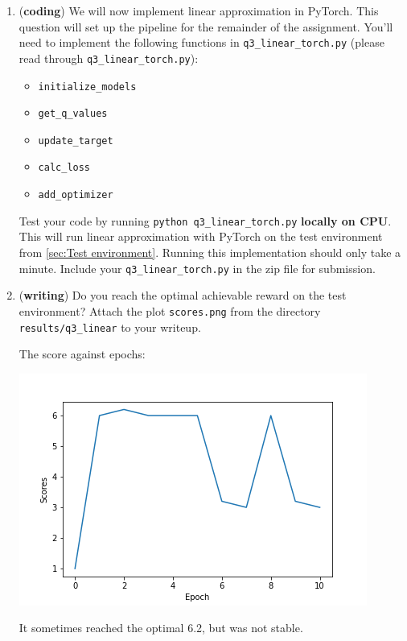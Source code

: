 \documentclass[11pt]{article}
\theoremstyle{case}
\begin{document}
\begin{enumerate}[label=(\alph*)]
    \item ({\bf coding}) We will now implement linear approximation in PyTorch. This question will set up the pipeline for the remainder of the assignment. You'll need to implement the following functions in \texttt{q3\_linear\_torch.py} (please read through \texttt{q3\_linear\_torch.py}):
    \begin{itemize}
    	\item \texttt{initialize\_models}
    	\item \texttt{get\_q\_values}
    	\item \texttt{update\_target}
    	\item \texttt{calc\_loss}
    	\item \texttt{add\_optimizer}
    \end{itemize}
    Test your code by running \texttt{python q3\_linear\_torch.py} \textbf{locally on CPU}.  This will run linear approximation with PyTorch on the test environment from \ref{sec:Test environment}.  Running this implementation should only take a minute.
    Include your \texttt{q3\_linear\_torch.py} in the zip file for submission.
    
    \item ({\bf writing}) Do you reach the optimal achievable reward on the test environment? Attach the plot \texttt{scores.png} from the directory \texttt{results/q3\_linear} to your writeup.
    \begin{shaded}
	The score against epochs:\\
    \begin{minipage}{1\linewidth}\centering
	\includegraphics[width=0.80\linewidth]{./starter_code_torch/results/q3_linear/scores.png}
	\end{minipage}
	It sometimes reached the optimal 6.2, but was not stable.
    \end{shaded}
    

\end{enumerate}
\end{document}
